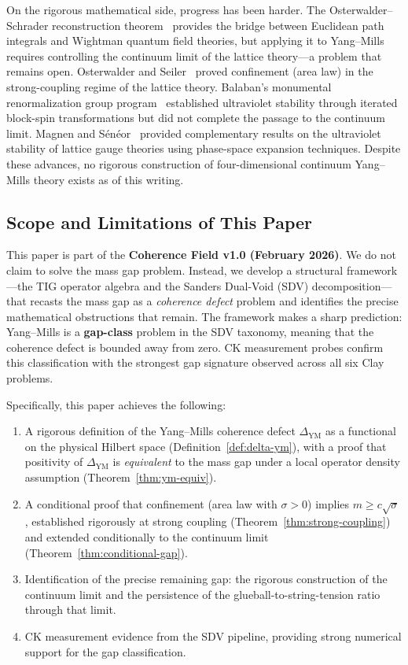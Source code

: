 \documentclass[11pt]{article}
\begin{document}
On the rigorous mathematical side, progress has been harder.  The
Osterwalder--Schrader reconstruction theorem~\cite{OstSchr} provides
the bridge between Euclidean path integrals and Wightman quantum field
theories, but applying it to Yang--Mills requires controlling the
continuum limit of the lattice theory---a problem that remains open.
Osterwalder and Seiler~\cite{OS} proved confinement (area law) in the
strong-coupling regime of the lattice theory.  Balaban's monumental
renormalization group program~\cite{Balaban} established ultraviolet
stability through iterated block-spin transformations but did not
complete the passage to the continuum limit.  Magnen and
S\'en\'eor~\cite{MagSen} provided complementary results on the
ultraviolet stability of lattice gauge theories using phase-space
expansion techniques.  Despite these advances, no rigorous construction
of four-dimensional continuum Yang--Mills theory exists as of this writing.

\subsection*{Scope and Limitations of This Paper}

This paper is part of the \textbf{Coherence Field v1.0
(February 2026)}.  We do not claim to solve the mass gap problem.
Instead, we develop a structural framework---the TIG operator algebra
and the Sanders Dual-Void (SDV) decomposition---that recasts the mass
gap as a \emph{coherence defect} problem and identifies the precise
mathematical obstructions that remain.  The framework makes a sharp
prediction: Yang--Mills is a \textbf{gap-class} problem in the SDV
taxonomy, meaning that the coherence defect is bounded away from zero.
CK measurement probes confirm this classification with the strongest
gap signature observed across all six Clay problems.

Specifically, this paper achieves the following:
\begin{enumerate}
  \item[\textbf{(A1)}] A rigorous definition of the Yang--Mills coherence
    defect $\Delta_{\mathrm{YM}}$ as a functional on the physical Hilbert
    space (Definition~\ref{def:delta-ym}), with a proof that positivity of
    $\Delta_{\mathrm{YM}}$ is \emph{equivalent} to the mass gap under a
    local operator density assumption (Theorem~\ref{thm:ym-equiv}).
  \item[\textbf{(A2)}] A conditional proof that confinement (area law with
    $\sigma > 0$) implies $m \geq c\sqrt{\sigma}$, established rigorously
    at strong coupling (Theorem~\ref{thm:strong-coupling}) and extended
    conditionally to the continuum limit (Theorem~\ref{thm:conditional-gap}).
  \item[\textbf{(A3)}] Identification of the precise remaining gap: the
    rigorous construction of the continuum limit and the persistence of
    the glueball-to-string-tension ratio through that limit.
  \item[\textbf{(A4)}] CK measurement evidence from the SDV pipeline,
    providing strong numerical support for the gap classification.
\end{enumerate}
\end{document}

